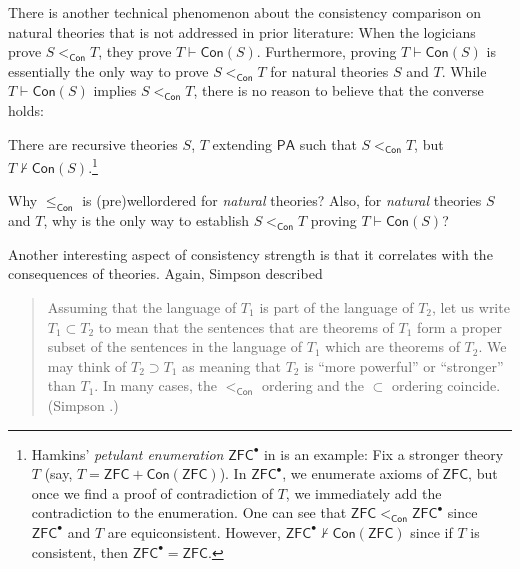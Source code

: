 \documentclass{mhkr}
\newcommand{\added}[1]{#1}
\newcommand{\Con}{\mathsf{Con}}
\newcommand{\ZFC}{\mathsf{ZFC}}
\newcommand{\PA}{\mathsf{PA}}
\begin{document}
\added{
There is another technical phenomenon about the consistency comparison on natural theories that is not addressed in prior literature: When the logicians prove $S<_\Con T$, they prove $T\vdash \Con(S)$. Furthermore, proving $T\vdash \Con(S)$ is essentially the only way to prove $S<_\Con T$ for natural theories $S$ and $T$.
While $T\vdash \Con(S)$ implies $S<_\Con T$, there is no reason to believe that the converse holds:
\begin{theorem} \label{Theorem: Unnatural examples for the consistency jump}
    There are recursive theories $S$, $T$ extending $\PA$ such that $S <_\Con T$, but $T\nvdash \Con(S)$.\footnote{Hamkins' \emph{petulant enumeration} $\ZFC^\bullet$ in \cite[\S 5]{Hamkins2022Nonlinearity} is an example: Fix a stronger theory $T$ (say, $T = \ZFC + \Con(\ZFC)$). In $\ZFC^\bullet$, we enumerate axioms of $\ZFC$, but once we find a proof of contradiction of $T$, we immediately add the contradiction to the enumeration. One can see that $\ZFC <_\Con \ZFC^\bullet$ since $\ZFC^\bullet$ and $T$ are equiconsistent. However, $\ZFC^\bullet \nvdash \Con(\ZFC)$ since if $T$ is consistent, then $\ZFC^\bullet = \ZFC$.}
\end{theorem}

\begin{question} \label{Question: How to explain the phenomena for natural theories}
    Why $\le_\Con$ is (pre)wellordered for \emph{natural} theories?
    Also, for \emph{natural} theories $S$ and $T$, why is the only way to establish $S<_\Con T$ proving $T\vdash \Con(S)$?
\end{question}
}

Another interesting aspect of consistency strength is that it correlates with the consequences of theories. Again, Simpson described
\begin{quote}
     Assuming that the language of $T_1$ is part of the language of $T_2$, let us write $T_1 \subset T_2$ to mean that the sentences that are theorems of $T_1$ form a proper subset of the sentences in the language of $T_1$ which are theorems of $T_2$. We may think of $T_2 \supset T_1$ as meaning that $T_2$ is ``more powerful'' or ``stronger'' than $T_1$. In many cases, the $<_\Con$ ordering and the $\subset$ ordering coincide. (Simpson \cite[p.111--112]{Simpson2010GodelHierarchy}.)
\end{quote}
\end{document}
